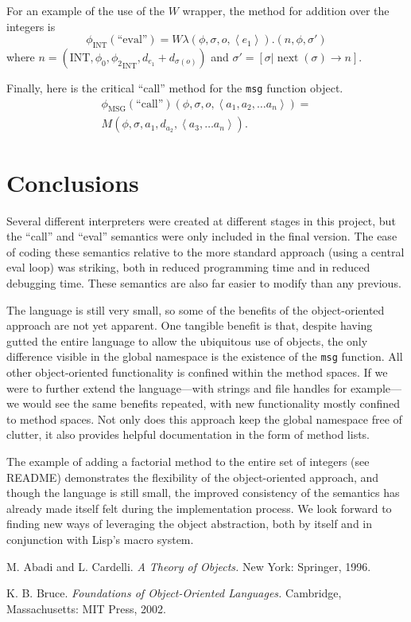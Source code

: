 \documentclass[twocolumn]{article}
\begin{document}
For an example of the use of the $W$ wrapper, the method for addition
over the integers is
\[ \phi_{\text{INT}}(\text{``eval''}) = W
\lambda(\phi,\sigma,o,\left<e_1\right>).(n,\phi,\sigma') \] where
$n = (\text{INT},\phi_0,{\phi_2}_{\text{INT}},d_{e_1}+d_{\sigma(o)})$ and
$\sigma' = [\sigma|\operatorname{next}(\sigma)\rightarrow n]$.

Finally, here is the critical ``call'' method for the \texttt{msg}
function object.
\begin{multline*}
  \phi_{\text{MSG}}(\text{``call''})(\phi,\sigma,o,\left<a_1,a_2,
  \ldots a_n \right>) = \\M(\phi,\sigma,a_1,d_{a_2}, \left<a_3,\ldots
  a_n\right>).
\end{multline*}


\section*{Conclusions}
Several different interpreters were created at different stages in
this project, but the ``call'' and ``eval'' semantics were only
included in the final version. The ease of coding these semantics
relative to the more standard approach (using a central eval loop) was
striking, both in reduced programming time and in reduced debugging
time. These semantics are also far easier to modify than any previous.

The language is still very small, so some of the benefits of the
object-oriented approach are not yet apparent. One tangible benefit is
that, despite having gutted the entire language to allow the
ubiquitous use of objects, the only difference visible in the global
namespace is the existence of the \texttt{msg} function. All other
object-oriented functionality is confined within the method spaces. If
we were to further extend the language---with strings and file handles
for example---we would see the same benefits repeated, with new
functionality mostly confined to method spaces. Not only does this
approach keep the global namespace free of clutter, it also provides
helpful documentation in the form of method lists.

The example of adding a factorial method to the entire set of integers
(see README) demonstrates the flexibility of the object-oriented
approach, and though the language is still small, the improved
consistency of the semantics has already made itself felt during the
implementation process. We look forward to finding new ways of
leveraging the object abstraction, both by itself and in conjunction
with Lisp's macro system.

\begin{thebibliography}{9}
 M. Abadi and L. Cardelli. \textit{A Theory of Objects.} New
  York: Springer, 1996.

 K. B. Bruce. \textit{Foundations of Object-Oriented
    Languages.} Cambridge, Massachusetts: MIT Press, 2002.
\end{thebibliography}
\end{document}

